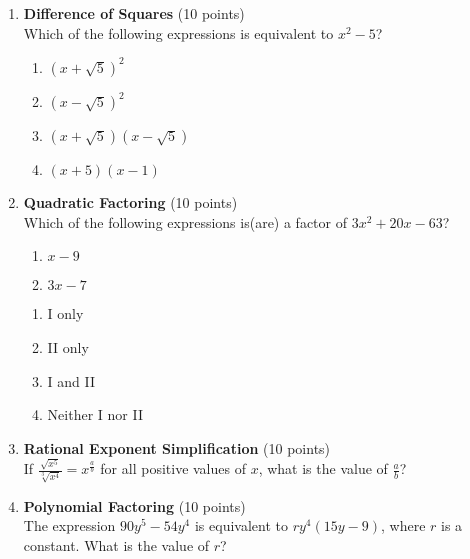 \begin{enumerate}
  \item \textbf{Difference of Squares} (10 points)\\
  Which of the following expressions is equivalent to $x^{2}-5$?
  \begin{enumerate}[label=(\Alph*)]
    \item $(x+\sqrt{5})^{2}$
    \item $(x-\sqrt{5})^{2}$
    \item $(x+\sqrt{5})(x-\sqrt{5})$
    \item $(x+5)(x-1)$
  \end{enumerate}
  \begin{subanswer}
  \end{subanswer}

  \item \textbf{Quadratic Factoring} (10 points)\\
  Which of the following expressions is(are) a factor of $3 x^{2}+20 x-63$?
  \begin{enumerate}[label=(\Roman*)]
    \item $x-9$
    \item $3 x-7$
  \end{enumerate}
  \begin{enumerate}[label=(\Alph*)]
    \item I only
    \item II only
    \item I and II
    \item Neither I nor II
  \end{enumerate}
  \begin{subanswer}
  \end{subanswer}

  \item \textbf{Rational Exponent Simplification} (10 points)\\
  If $\frac{\sqrt{x^{5}}}{\sqrt[3]{x^{4}}}=x^{\frac{a}{b}}$ for all positive values of $x$, what is the value of $\frac{a}{b}$?
  \begin{subanswer}
  \end{subanswer}

  \item \textbf{Polynomial Factoring} (10 points)\\
  The expression $90 y^{5}-54 y^{4}$ is equivalent to $r y^{4}(15 y-9)$, where $r$ is a constant. What is the value of $r$?
  \begin{subanswer}
  \end{subanswer}


\end{enumerate}
